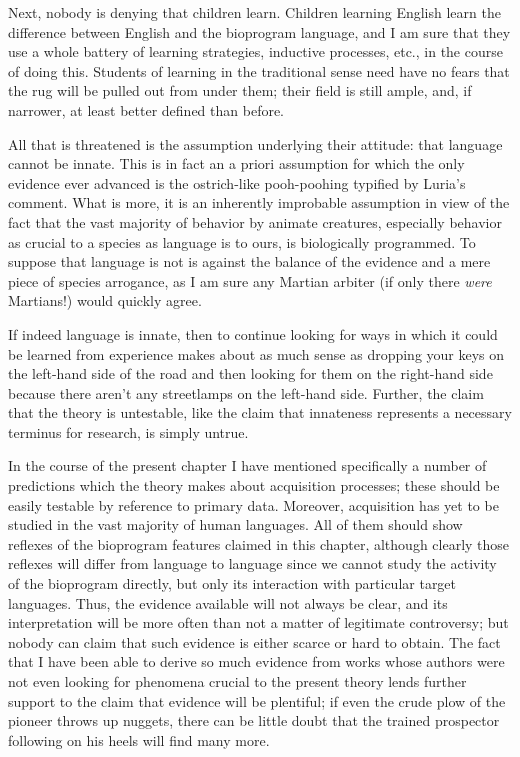 Next, nobody is denying that children learn. Children learning English learn the difference between English and the bioprogram language, and I am sure that they use a whole battery of learning strategies, inductive processes, etc., in the course of doing this. Students of learning in the traditional sense need have no fears that the rug will be pulled out from under them; their field is still ample, and, if narrower, at least better defined than before.

All that is threatened is the assumption underlying their attitude: that language cannot be innate. This is in fact an a priori assumption for which the only evidence ever advanced is the ostrich-like pooh-poohing typified by Luria's comment. What is more, it is an inherently improbable assumption in view of the fact that the vast majority of behavior by animate creatures, especially behavior as crucial to a species as language is to ours, is biologically programmed. To suppose that language is not is against the balance of the evidence and a mere piece of species arrogance, as I am sure any Martian arbiter (if only there \textit{were} Martians!) would quickly agree.

If indeed language is innate, then to continue looking for ways in which it could be learned from experience makes about as much sense as dropping your keys on the left-hand side of the road and then looking for them on the right-hand side because there aren't any streetlamps on the left-hand side. Further, the claim that the theory is untestable, like the claim that innateness represents a necessary terminus for research, is simply untrue.


In the course of the present chapter I have mentioned specifically a number of predictions which the theory makes about acquisition processes; these should be easily testable by reference to primary data. Moreover, acquisition has yet to be studied in the vast majority of human languages. All of them should show reflexes of the bioprogram features claimed in this chapter, although clearly those reflexes will differ from language to language since we cannot study the activity of the bioprogram directly, but only its interaction with particular target languages. Thus, the evidence available will not always be clear, and its interpretation will be more often than not a matter of legitimate controversy; but nobody can claim that such evidence is either scarce or hard to obtain. The fact that I have been able to derive so much evidence from works whose authors were not even looking for phenomena crucial to the present theory lends further support to the claim that evidence will be plentiful; if even the crude plow of the pioneer throws up nuggets, there can be little doubt that the trained prospector following on his heels will find many more.

